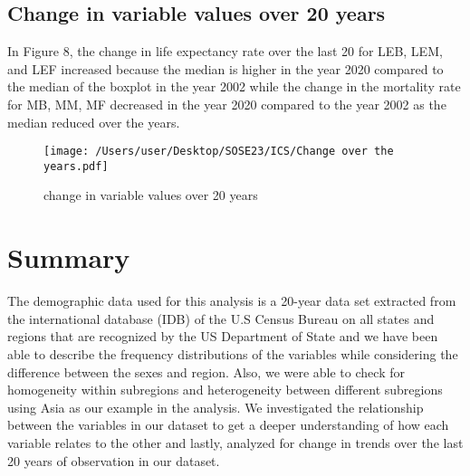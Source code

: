 \documentclass[12 pt]{scrartcl}
\begin{document}
\subsection{Change in variable values over 20 years }
In Figure 8, the change in life expectancy rate over the last 20 for LEB, LEM, and LEF increased because the median is higher in the year 2020 compared to the median of the boxplot in the year 2002 while the change in the mortality rate for MB, MM, MF decreased in the year 2020 compared to the year 2002 as the median reduced over the years.

\begin{figure}[tb]
\centering
\texttt{[image: /Users/user/Desktop/SOSE23/ICS/Change over the years.pdf]}
\caption{change in variable values over 20 years}
\label{fig:scatterplot}
\end{figure}







\section{Summary}

The demographic data used for this analysis is a 20-year data set extracted from the international database (IDB) of the U.S Census Bureau on all states and regions that are recognized by the US Department of State and we have been able to describe the frequency distributions of the variables while considering the difference between the sexes and region. Also, we were able to check for homogeneity within subregions and heterogeneity between different subregions using Asia as our example in the analysis. We investigated the relationship between the variables in our dataset to get a deeper understanding of how each variable relates to the other and lastly, analyzed for change in trends over the last 20 years of observation in our dataset.
\end{document}
